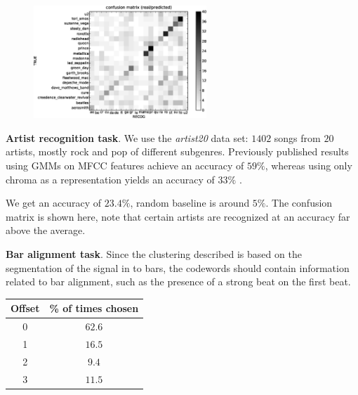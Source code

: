 \documentclass[portrait,a0b,final]{a0poster}
\newenvironment{poster}{
  \begin{center}
  \begin{minipage}[c]{0.98\textwidth}
}{
  \end{minipage} 
  \end{center}
}
\newcommand{\mytablecaption}[1]{
  \vspace{1.0cm}
  \begin{quote}
    {{\sc Table} \arabic{table}: #1}
  \end{quote}
  \vspace{1cm}
  \stepcounter{table}
}
\begin{document}
\begin{poster}
\begin{multicols}{3}
\begin{minipage}[c]{\columnwidth}
\begin{figure}
  \vspace{-20pt}
  \begin{center}
    \includegraphics[width=0.58\textwidth]{conf_mat_per_artist.ps}
  \end{center}
  \vspace{-20pt}
\end{figure}

\textbf{Artist recognition task}.
We use the {\it artist20} data set: $1402$ songs from $20$ artists, 
mostly rock and pop of different subgenres.  
Previously published results using GMMs on MFCC features achieve an 
accuracy of $59\%$, whereas using only chroma as a representation yields an
accuracy of $33\%$  \cite{Ellis2007}.

We get an accuracy of $\mathbf{23.4\%}$, random baseline 
is around $5\%$. 
The confusion matrix is shown here, note 
that certain artists are recognized at an accuracy far above the average.

\end{minipage}

\vspace{2cm}

\begin{minipage}[c][9cm][c]{\columnwidth}
\textbf{Bar alignment task}.
Since the clustering described is based
on the segmentation of the signal in to bars, 
the codewords should contain information related to bar
alignment, such as the presence of a strong beat on the first beat.\\
\end{minipage}
\begin{minipage}[c][9cm][c]{0.21\textwidth}
  \begin{center}
      \begin{tabular}{cc}
        Offset & \% of times chosen \\ \hline \hline
        0 & $\mathbf{62.6}$\\
        1 & $16.5$\\
        2 & $9.4$\\
        3 & $11.5$
      \end{tabular}
      \label{tab:offset}
  \end{center}
\end{minipage}


\end{multicols}
\end{poster}
\end{document}
